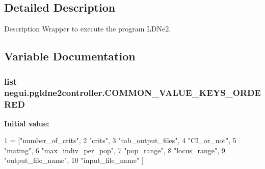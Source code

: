 \subsection{Detailed Description}
\begin{DoxyVerb}Description
Wrapper to execute the program LDNe2.
\end{DoxyVerb}
 

\subsection{Variable Documentation}
\subsubsection[{\texorpdfstring{C\+O\+M\+M\+O\+N\+\_\+\+V\+A\+L\+U\+E\+\_\+\+K\+E\+Y\+S\+\_\+\+O\+R\+D\+E\+R\+ED}{COMMON_VALUE_KEYS_ORDERED}}]{\setlength{\rightskip}{0pt plus 5cm}list negui.\+pgldne2controller.\+C\+O\+M\+M\+O\+N\+\_\+\+V\+A\+L\+U\+E\+\_\+\+K\+E\+Y\+S\+\_\+\+O\+R\+D\+E\+R\+ED}\hypertarget{namespacenegui_1_1pgldne2controller_ad622d2a65f0230f3674ca806d68885bc}{}\label{namespacenegui_1_1pgldne2controller_ad622d2a65f0230f3674ca806d68885bc}
{\bfseries Initial value\+:}
\begin{DoxyCode}
1 = [\textcolor{stringliteral}{"number\_of\_crits"},
2                                     \textcolor{stringliteral}{"crits"},
3                                     \textcolor{stringliteral}{"tab\_output\_files"},
4                                     \textcolor{stringliteral}{"CI\_or\_not"},
5                                     \textcolor{stringliteral}{"mating"},
6                                     \textcolor{stringliteral}{"max\_indiv\_per\_pop"},
7                                     \textcolor{stringliteral}{"pop\_range"},
8                                     \textcolor{stringliteral}{"locus\_range"},
9                                     \textcolor{stringliteral}{"output\_file\_name"},
10                                     \textcolor{stringliteral}{"input\_file\_name"} ]
\end{DoxyCode}


